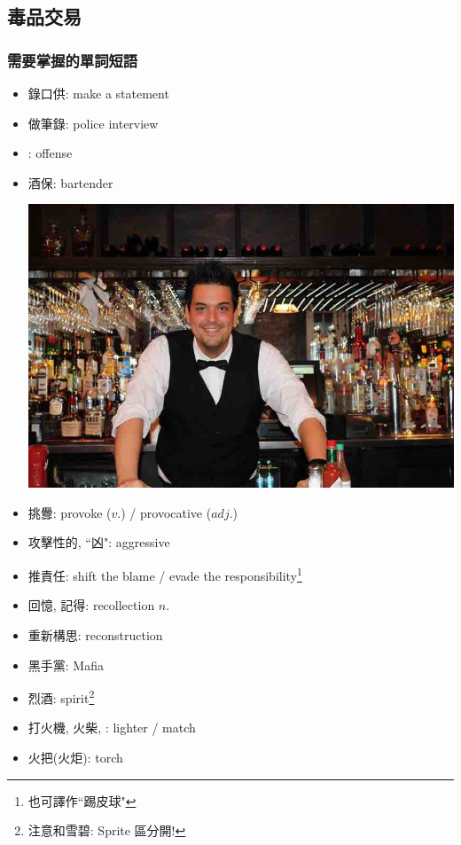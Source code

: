 \subsection{毒品交易}
\subsubsection*{需要掌握的單詞短語}
\begin{multicols}{2}
\begin{itemize}
  \itemsep0em
  \item 錄口供: make a statement
  \item 做筆錄: police interview
  \item {}: offense
  \item 酒保: bartender
  \begin{center}
    \includegraphics[scale=0.3]{pics/bartender}
  \end{center}
  \item 挑釁: provoke ($v.$) / provocative ($adj.$)
  \item 攻擊性的, ``凶": aggressive
  \item 推責任: shift the blame / evade the responsibility\footnote{也可譯作``踢皮球"}
  \item 回憶, 記得: recollection $n.$
  \item 重新構思: reconstruction
  \item 黑手黨: Mafia
  \item 烈酒: spirit\footnote{注意和雪碧: Sprite 區分開!}
  \item 打火機, 火柴, : lighter / match
  \item 火把(火炬): torch

\end{itemize}
\end{multicols}
